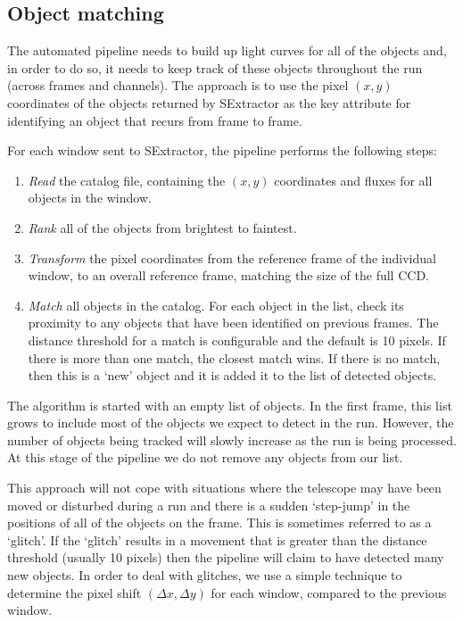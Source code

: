 \subsection{Object matching}
The automated pipeline needs to build up light curves for all of the objects and, in order to do so, it needs to keep track of these objects throughout the run (across frames and channels). The approach is to use the pixel $(x, y)$ coordinates of the objects returned by SExtractor as the key attribute for identifying an object that recurs from frame to frame. 

For each window sent to SExtractor, the pipeline performs the following steps:
\begin{enumerate}
  \item \emph{Read} the catalog file, containing the $(x, y)$ coordinates and fluxes for all objects in the window.
  \item \emph{Rank} all of the objects from brightest to faintest.
  \item \emph{Transform} the pixel coordinates from the reference frame of the individual window, to an overall reference frame, matching the size of the full CCD. 
  \item \emph{Match} all objects in the catalog. For each object in the list, check its proximity to any objects that have been identified on previous frames. The distance threshold for a match is configurable and the default is 10 pixels. If there is more than one match, the closest match wins. If there is no match, then this is a `new' object and it is added it to the list of detected objects.  
\end{enumerate}

The algorithm is started with an empty list of objects. In the first frame, this list grows to include most of the objects we expect to detect in the run. However, the number of objects being tracked will slowly increase as the run is being processed. At this stage of the pipeline we do not remove any objects from our list. 

This approach will not cope with situations where the telescope may have been moved or disturbed during a run and there is a sudden `step-jump' in the positions of all of the objects on the frame. This is sometimes referred to as a `glitch'. If the `glitch' results in a movement that is greater than the distance threshold (usually 10 pixels) then the pipeline will claim to have detected many new objects. In order to deal with glitches, we use a simple technique to determine the pixel shift $(\Delta x, \Delta y)$ for each window, compared to the previous window. 

